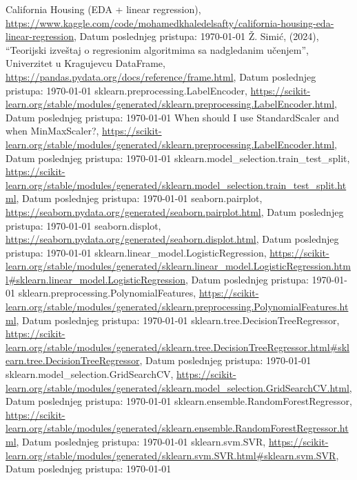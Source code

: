 \documentclass[fontsize=12bp, paper=a4]{scrarticle}
\begin{document}

\newpage

\begin{thebibliography}{1}
    California Housing (EDA + linear regression), \url{https://www.kaggle.com/code/mohamedkhaledelsafty/california-housing-eda-linear-regression}, Datum poslednjeg pristupa: \today
    Ž. Simić, (2024), ``Teorijski izveštaj o regresionim algoritmima sa nadgledanim učenjem'', Univerzitet u Kragujevcu
    DataFrame, \url{https://pandas.pydata.org/docs/reference/frame.html}, Datum poslednjeg pristupa: \today
    sklearn.preprocessing.LabelEncoder, \url{https://scikit-learn.org/stable/modules/generated/sklearn.preprocessing.LabelEncoder.html}, Datum poslednjeg pristupa: \today
    When should I use StandardScaler and when MinMaxScaler?, \url{https://scikit-learn.org/stable/modules/generated/sklearn.preprocessing.LabelEncoder.html}, Datum poslednjeg pristupa: \today
    {sklearn.model\_selection.train\_test\_split}, \url{https://scikit-learn.org/stable/modules/generated/sklearn.model_selection.train_test_split.html}, Datum poslednjeg pristupa: \today
    seaborn.pairplot, \url{https://seaborn.pydata.org/generated/seaborn.pairplot.html}, Datum poslednjeg pristupa: \today
    seaborn.displot, \url{https://seaborn.pydata.org/generated/seaborn.displot.html}, Datum poslednjeg pristupa: \today
    sklearn.linear\_model.LogisticRegression, \url{https://scikit-learn.org/stable/modules/generated/sklearn.linear\_model.LogisticRegression.html#sklearn.linear\_model.LogisticRegression}, Datum poslednjeg pristupa: \today
    sklearn.preprocessing.PolynomialFeatures, \url{https://scikit-learn.org/stable/modules/generated/sklearn.preprocessing.PolynomialFeatures.html}, Datum poslednjeg pristupa: \today
    sklearn.tree.DecisionTreeRegressor, \url{https://scikit-learn.org/stable/modules/generated/sklearn.tree.DecisionTreeRegressor.html#sklearn.tree.DecisionTreeRegressor}, Datum poslednjeg pristupa: \today
    sklearn.model\_selection.GridSearchCV, \url{https://scikit-learn.org/stable/modules/generated/sklearn.model\_selection.GridSearchCV.html}, Datum poslednjeg pristupa: \today
    sklearn.ensemble.RandomForestRegressor, \url{https://scikit-learn.org/stable/modules/generated/sklearn.ensemble.RandomForestRegressor.html}, Datum poslednjeg pristupa: \today
    sklearn.svm.SVR, \url{https://scikit-learn.org/stable/modules/generated/sklearn.svm.SVR.html#sklearn.svm.SVR}, Datum poslednjeg pristupa: \today
    

\end{thebibliography}






\end{document}
